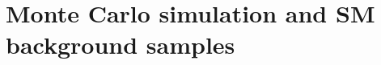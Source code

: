 \clearpage{\pagestyle{empty}\cleardoublepage}

\chapter{Monte Carlo simulation and SM background samples}\label{chap:mc}
